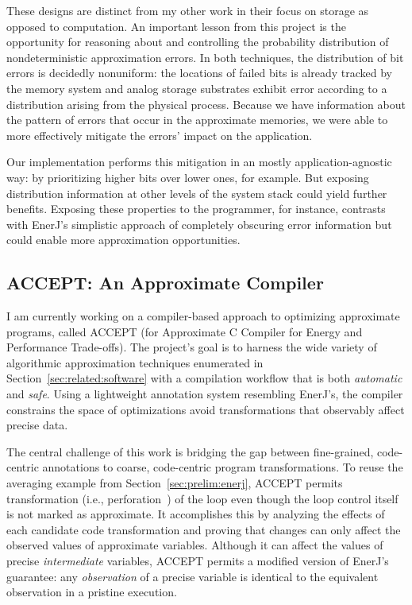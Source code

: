 These designs are distinct from my other work in their focus on storage as
opposed to computation. An important lesson from this project is the
opportunity for reasoning about and controlling the probability distribution
of nondeterministic approximation errors. In both techniques, the distribution
of bit errors is decidedly nonuniform: the locations of failed bits is already
tracked by the memory system and analog storage substrates exhibit error
according to a distribution arising from the physical process. Because we have
information about the pattern of errors that occur in the approximate
memories, we were able to more effectively mitigate the errors' impact on the
application.

Our implementation performs this mitigation in an mostly application-agnostic
way: by prioritizing higher bits over lower ones, for example. But exposing
distribution information at other levels of the system stack could yield
further benefits. Exposing these properties to the programmer, for instance,
contrasts with EnerJ's simplistic approach of completely obscuring error
information but could enable more approximation opportunities.

\subsection{ACCEPT: An Approximate Compiler}
\label{sec:prelim:accept}

I am currently working on a compiler-based approach to optimizing approximate
programs, called ACCEPT (for Approximate C Compiler for Energy and Performance
Trade-offs). The project's goal is to harness the wide variety of
algorithmic approximation techniques enumerated in
Section~\ref{sec:related:software} with a compilation workflow that is both
\emph{automatic} and \emph{safe}. Using a lightweight annotation system
resembling EnerJ's, the compiler constrains the space of optimizations avoid
transformations that observably affect precise data.

The central challenge of this work is bridging the gap between fine-grained,
code-centric annotations to coarse, code-centric program transformations. To
reuse the averaging example from Section~\ref{sec:prelim:enerj}, ACCEPT
permits transformation (i.e., perforation~\cite{perforation}) of the
 loop even though the loop control itself is not marked as
approximate. It accomplishes this by analyzing the effects of each candidate
code transformation and proving that changes can only affect the
observed values of approximate variables. Although it can affect the values of
precise \emph{intermediate} variables, ACCEPT permits a modified version of
EnerJ's guarantee: any \emph{observation} of a precise variable is identical
to the equivalent observation in a pristine execution.

